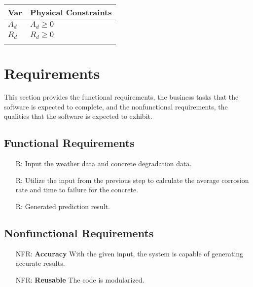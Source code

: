 \documentclass[12pt]{article}
\newcounter{reqnum} %
\newcounter{nfrnum} %
\begin{document}
\begin{table}[!h]
\caption{Output Variables} \label{TblOutputVar}
\renewcommand{\arraystretch}{1.2}
\noindent \begin{longtable*}{l l} 
  \toprule
  \textbf{Var} & \textbf{Physical Constraints} \\
  \midrule 
  $A_d$ & $A_d \ge 0$\\
  $R_d$ & $R_d \ge 0$\\
  \\
  \bottomrule
\end{longtable*}
\end{table}

\section{Requirements}

This section provides the functional requirements, the business tasks that the
software is expected to complete, and the nonfunctional requirements, the
qualities that the software is expected to exhibit.

\subsection{Functional Requirements}

\noindent \begin{itemize}

\item[R\refstepcounter{reqnum}\thereqnum \label{R_Inputs}:] Input the weather data and concrete degradation data.

\item[R\refstepcounter{reqnum}\thereqnum \label{R_OutputInputs}:] Utilize the input from the previous step to calculate the average corrosion rate and time to failure for the concrete.

\item[R\refstepcounter{reqnum}\thereqnum \label{R_Calculate}:] Generated prediction result.

\end{itemize}

\subsection{Nonfunctional Requirements}

\noindent \begin{itemize}

\item[NFR\refstepcounter{nfrnum}\thenfrnum \label{NFR_Accuracy}:]
  \textbf{Accuracy} With the given input, the system is capable of generating accurate results.

\item[NFR\refstepcounter{nfrnum}\thenfrnum \label{NFR_Verifiable}:] \textbf{Reusable} The code is modularized.

\end{itemize}
\end{document}

